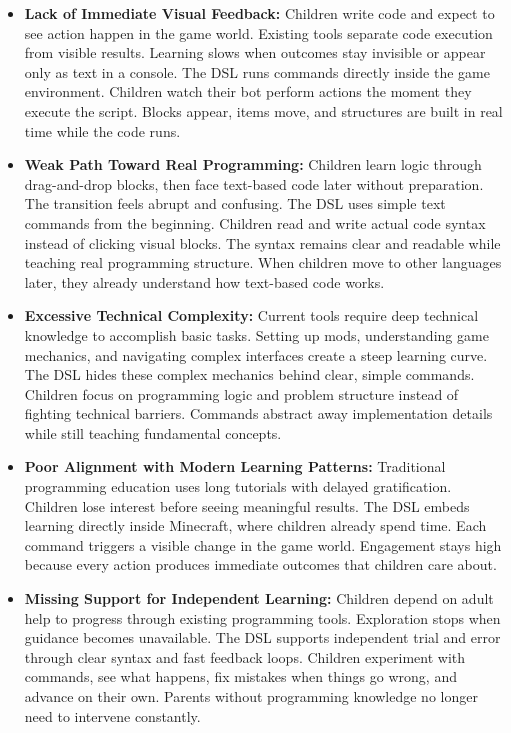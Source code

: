 \begin{itemize}
    \item[\textbf{--}] \textbf{Lack of Immediate Visual Feedback:} 
    Children write code and expect to see action happen in the game world. 
    Existing tools separate code execution from visible results. 
    Learning slows when outcomes stay invisible or appear only as text in a console. 
    The DSL runs commands directly inside the game environment. 
    Children watch their bot perform actions the moment they execute the script. 
    Blocks appear, items move, and structures are built in real time while the code runs.

    \item[\textbf{--}] \textbf{Weak Path Toward Real Programming:} 
    Children learn logic through drag-and-drop blocks, then face text-based code later without preparation. 
    The transition feels abrupt and confusing. 
    The DSL uses simple text commands from the beginning. 
    Children read and write actual code syntax instead of clicking visual blocks. 
    The syntax remains clear and readable while teaching real programming structure. 
    When children move to other languages later, they already understand how text-based code works.

    \item[\textbf{--}] \textbf{Excessive Technical Complexity:} 
    Current tools require deep technical knowledge to accomplish basic tasks. 
    Setting up mods, understanding game mechanics, and navigating complex interfaces create a steep learning curve. 
    The DSL hides these complex mechanics behind clear, simple commands. 
    Children focus on programming logic and problem structure instead of fighting technical barriers. 
    Commands abstract away implementation details while still teaching fundamental concepts.

    \item[\textbf{--}] \textbf{Poor Alignment with Modern Learning Patterns:} 
    Traditional programming education uses long tutorials with delayed gratification. 
    Children lose interest before seeing meaningful results. 
    The DSL embeds learning directly inside Minecraft, where children already spend time. 
    Each command triggers a visible change in the game world. 
    Engagement stays high because every action produces immediate outcomes that children care about.

    \item[\textbf{--}] \textbf{Missing Support for Independent Learning:} 
    Children depend on adult help to progress through existing programming tools. 
    Exploration stops when guidance becomes unavailable. 
    The DSL supports independent trial and error through clear syntax and fast feedback loops. 
    Children experiment with commands, see what happens, fix mistakes when things go wrong, and advance on their own. 
    Parents without programming knowledge no longer need to intervene constantly.


\end{itemize}
